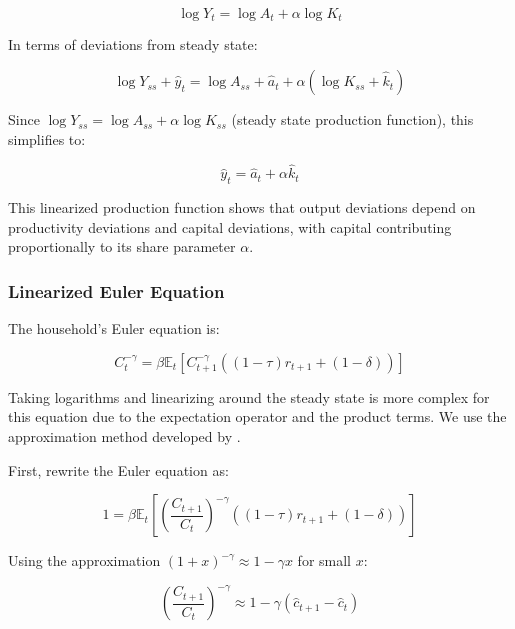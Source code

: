 \documentclass[5p,authoryear]{elsarticle}
\begin{document}
\begin{equation}
\log Y_t = \log A_t + \alpha \log K_t
\label{eq:log_production}
\end{equation}

In terms of deviations from steady state:

\begin{equation}
\log Y_{ss} + \hat{y}_t = \log A_{ss} + \hat{a}_t + \alpha (\log K_{ss} + \hat{k}_t)
\label{eq:production_deviations}
\end{equation}

Since $\log Y_{ss} = \log A_{ss} + \alpha \log K_{ss}$ (steady state production function), this simplifies to:

\begin{equation}
\hat{y}_t = \hat{a}_t + \alpha \hat{k}_t
\label{eq:linearized_production}
\end{equation}

This linearized production function shows that output deviations depend on productivity deviations and capital deviations, with capital contributing proportionally to its share parameter $\alpha$.

\subsubsection{Linearized Euler Equation}

The household's Euler equation is:

\begin{equation}
C_t^{-\gamma} = \beta \mathbb{E}_t \left[ C_{t+1}^{-\gamma} \left( (1-\tau) r_{t+1} + (1-\delta) \right) \right]
\label{eq:euler_nonlinear}
\end{equation}

Taking logarithms and linearizing around the steady state is more complex for this equation due to the expectation operator and the product terms. We use the approximation method developed by \citet{uhlig1999toolkit}.

First, rewrite the Euler equation as:

\begin{equation}
1 = \beta \mathbb{E}_t \left[ \left(\frac{C_{t+1}}{C_t}\right)^{-\gamma} \left( (1-\tau) r_{t+1} + (1-\delta) \right) \right]
\label{eq:euler_ratio}
\end{equation}

Using the approximation $(1+x)^{-\gamma} \approx 1 - \gamma x$ for small $x$:

\begin{equation}
\left(\frac{C_{t+1}}{C_t}\right)^{-\gamma} \approx 1 - \gamma (\hat{c}_{t+1} - \hat{c}_t)
\label{eq:consumption_ratio_approx}
\end{equation}
\end{document}
